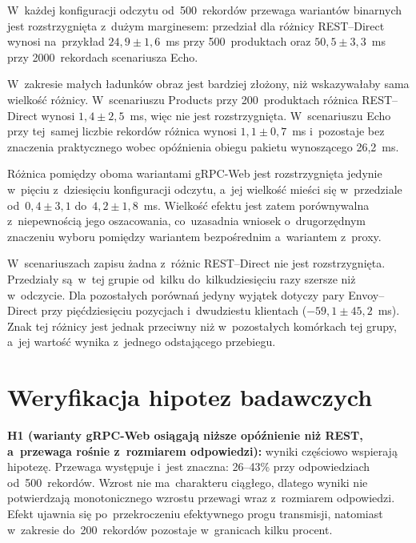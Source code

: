 W~każdej konfiguracji odczytu od~500~rekordów przewaga wariantów binarnych jest rozstrzygnięta z~dużym marginesem: przedział dla różnicy REST--Direct wynosi na~przykład $24{,}9 \pm 1{,}6$~ms przy 500~produktach oraz $50{,}5 \pm 3{,}3$~ms przy 2000~rekordach scenariusza Echo.

W~zakresie małych ładunków obraz jest bardziej złożony, niż wskazywałaby sama wielkość różnicy. W~scenariuszu Products przy 200~produktach różnica REST--Direct wynosi $1{,}4 \pm 2{,}5$~ms, więc nie jest rozstrzygnięta. W~scenariuszu Echo przy tej~samej liczbie rekordów różnica wynosi $1{,}1 \pm 0{,}7$~ms i~pozostaje bez znaczenia praktycznego wobec opóźnienia obiegu pakietu wynoszącego 26,2~ms.

Różnica pomiędzy oboma wariantami gRPC-Web jest rozstrzygnięta jedynie w~pięciu z~dziesięciu konfiguracji odczytu, a~jej wielkość mieści się w~przedziale od~$0{,}4 \pm 3{,}1$ do~$4{,}2 \pm 1{,}8$~ms. Wielkość efektu jest zatem porównywalna z~niepewnością jego oszacowania, co~uzasadnia wniosek o~drugorzędnym znaczeniu wyboru pomiędzy wariantem bezpośrednim a~wariantem z~proxy.

W~scenariuszach zapisu żadna z~różnic REST--Direct nie jest rozstrzygnięta. Przedziały są~w~tej grupie od~kilku do~kilkudziesięciu razy szersze niż w~odczycie. Dla pozostałych porównań jedyny wyjątek dotyczy pary Envoy--Direct przy pięćdziesięciu pozycjach i~dwudziestu klientach ($-59{,}1 \pm 45{,}2$~ms). Znak tej różnicy jest jednak przeciwny niż w~pozostałych komórkach tej grupy, a~jej wartość wynika z~jednego odstającego przebiegu.

\section{Weryfikacja hipotez badawczych}
\label{sec:WeryfikacjaHipotez}

\begin{sloppypar}
\textbf{H1 (warianty gRPC-Web osiągają niższe opóźnienie niż REST, a~przewaga rośnie z~rozmiarem odpowiedzi):} wyniki częściowo wspierają hipotezę. Przewaga występuje i~jest znaczna: 26--43\% przy odpowiedziach od~500~rekordów. Wzrost nie ma~charakteru ciągłego, dlatego wyniki nie potwierdzają monotonicznego wzrostu przewagi wraz z~rozmiarem odpowiedzi. Efekt ujawnia się po~przekroczeniu efektywnego progu transmisji, natomiast w~zakresie do~200~rekordów pozostaje w~granicach kilku procent.
\end{sloppypar}

